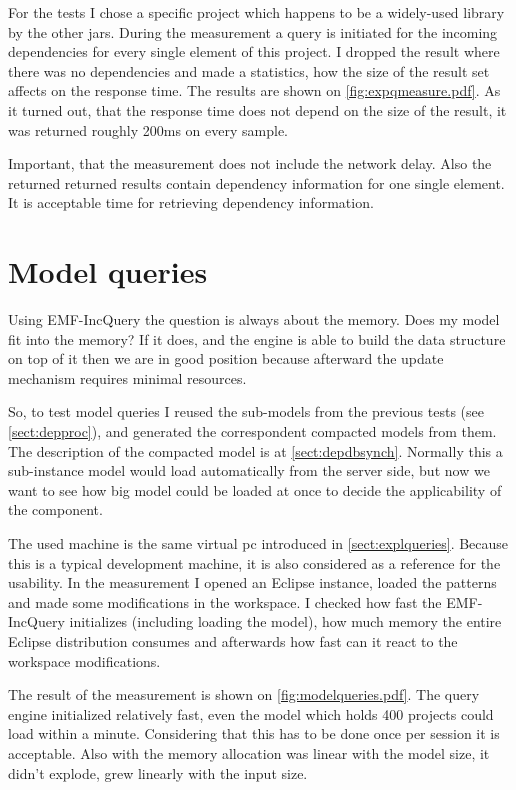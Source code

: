For the tests I chose a specific project which happens to be a widely-used
library by the other jars. During the measurement a query is initiated for 
the incoming dependencies for every single element of this project. 
I dropped the result where there was no dependencies and made a statistics, how 
the size of the result set affects on the response time.
The results are shown on \autoref{fig:expqmeasure.pdf}.
As it turned out, that the response time does not depend on the size of the result,
it was returned roughly 200ms on every sample. 

Important, that  the measurement does not include the network delay. Also the 
returned  returned results contain dependency information for one single element. 
It is acceptable time for retrieving dependency information. 


\section{Model queries}
Using EMF-IncQuery the question is always about the memory. Does my model fit into
the memory? If it does, and the engine is able to build the data structure on top
of it then we are in good position because afterward the update mechanism requires 
minimal resources. 

So, to test model queries I reused the sub-models from the previous tests (see
\autoref{sect:depproc}), and generated the correspondent compacted models from
them.
The description of the compacted model is at \autoref{sect:depdbsynch}. Normally
this a sub-instance model would load automatically from the server side, but now
we want to see how big model could be loaded at once to decide the applicability
of the component.

The used machine is the same virtual pc introduced in
\autoref{sect:explqueries}. Because this is a typical development machine, it is
also considered as a reference for the usability. In the measurement I opened an
Eclipse instance, loaded the patterns and made some modifications in the
workspace. I checked how fast the EMF-IncQuery initializes (including loading
the model), how much memory the entire Eclipse distribution consumes and
afterwards how fast can it react to the workspace modifications.

The result of the measurement is shown on \autoref{fig:modelqueries.pdf}.
The query engine initialized relatively fast, even the model which holds 400
projects could load within a minute. Considering that this has to be done once
per session it is acceptable. Also with the memory allocation was linear with 
the model size, it didn't explode, grew linearly with the input size. 

